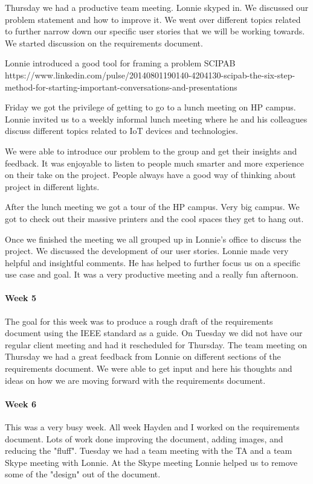 \documentclass[draftclsnofoot, onecolumn, compsoc, 10pt]{IEEEtran}
\begin{document}
Thursday we had a productive team meeting. Lonnie skyped in. We discussed our problem statement and how to improve it. We went over different topics related to further narrow down our specific user stories that we will be working towards.  We started discussion on the requirements document. 

Lonnie introduced a good tool for framing a problem SCIPAB https://www.linkedin.com/pulse/20140801190140-4204130-scipab-the-six-step-method-for-starting-important-conversations-and-presentations 

Friday we got the privilege of getting to go to a lunch meeting on HP campus. Lonnie invited us to a weekly informal lunch meeting where he and his colleagues discuss different topics related to IoT devices and technologies.   

We were able to introduce our problem to the group and get their insights and feedback. It was enjoyable to listen to people much smarter and more experience on their take on the project. People always have a good way of thinking about project in different lights. 

After the lunch meeting we got a tour of the HP campus. Very big campus. We got to check out their massive printers and the cool spaces they get to hang out.  

Once we finished the meeting we all grouped up in Lonnie's office to discuss the project. We discussed the development of our user stories. Lonnie made very helpful and insightful comments. He has helped to further focus us on a specific use case and goal. It was a very productive meeting and a really fun afternoon.  
\paragraph{Week 5}
The goal for this week was to produce a rough draft of the requirements document using the IEEE standard as a guide. On Tuesday we did not have our regular client meeting and had it rescheduled for Thursday. The team meeting on Thursday we had a great feedback from Lonnie on different sections of the requirements document. We were able to get input and here his thoughts and ideas on how we are moving forward with the requirements document. 
\paragraph{Week 6}
This was a very busy week. All week Hayden and I worked on the requirements document. Lots of work done improving the document, adding images, and reducing the "fluff". Tuesday we had a team meeting with the TA and a team Skype meeting with Lonnie. At the Skype meeting Lonnie helped us to remove some of the "design" out of the document.  
\end{document}
